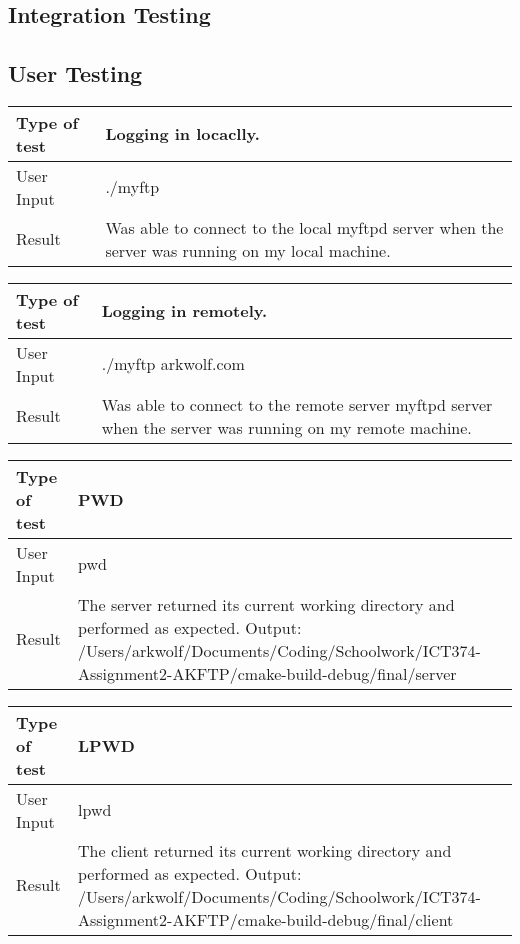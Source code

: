 \documentclass{article}
\begin{document}
\subsection{Integration Testing}

\subsection{User Testing}
    \begin{tabulary}{1.0\textwidth}{|L|L|}
    \hline Type of test & Logging in locaclly.\\
    \hline User Input & ./myftp \\
    \hline Result & Was able to connect to the local myftpd server when the server was running on my local machine.\\
    \hline
    \end{tabulary}
    \newline
    \begin{tabulary}{1.0\textwidth}{|L|L|}
    \hline Type of test & Logging in remotely.\\
    \hline User Input & ./myftp arkwolf.com\\
    \hline Result & Was able to connect to the remote server myftpd server when the server was running on my remote machine.\\
    \hline
    \end{tabulary}
    \newline
    \begin{tabulary}{1.0\textwidth}{|L|L|}
    \hline Type of test & PWD\\
    \hline User Input & pwd\\
    \hline Result & The server returned its current working directory and performed as expected. Output: /Users/arkwolf/Documents/Coding/Schoolwork/ICT374-Assignment2-AKFTP/cmake-build-debug/final/server\\
    \hline
    \end{tabulary}
    \newline
    \begin{tabulary}{1.0\textwidth}{|L|L|}
    \hline Type of test & LPWD\\
    \hline User Input & lpwd\\
    \hline Result & The client returned its current working directory and performed as expected. Output: /Users/arkwolf/Documents/Coding/Schoolwork/ICT374-Assignment2-AKFTP/cmake-build-debug/final/client\\
    \hline
    \end{tabulary}
\end{document}
